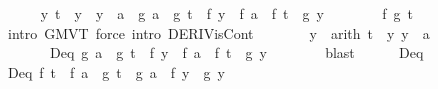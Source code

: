 \begin{isabellebody}
\isanewline
\ \ \ \ \isamarkupfalse%
\ {\isachardoublequoteopen}{\isasymexists}y{\isachardot}{\kern0pt}\ t\ {\isacharless}{\kern0pt}\ y\ {\isasymand}\ y\ {\isacharless}{\kern0pt}\ a\ {\isasymand}\ {\isacharparenleft}{\kern0pt}g\ a\ {\isacharminus}{\kern0pt}\ g\ t{\isacharparenright}{\kern0pt}\ {\isacharasterisk}{\kern0pt}\ f{\isacharprime}{\kern0pt}\ y\ {\isacharequal}{\kern0pt}\ {\isacharparenleft}{\kern0pt}f\ a\ {\isacharminus}{\kern0pt}\ f\ t{\isacharparenright}{\kern0pt}\ {\isacharasterisk}{\kern0pt}\ g{\isacharprime}{\kern0pt}\ y{\isachardoublequoteclose}\isanewline
\ \ \ \ \ \ \isamarkupfalse%
\ f{}\ g{}\ t{\isacharparenleft}{\kern0pt}{}{\isacharcomma}{\kern0pt}{}{\isacharparenright}{\kern0pt}\ \isamarkupfalse%
\ {\isacharparenleft}{\kern0pt}intro\ GMVT{\isacharprime}{\kern0pt}{\isacharparenright}{\kern0pt}\ {\isacharparenleft}{\kern0pt}force\ intro{\isacharbang}{\kern0pt}{\isacharcolon}{\kern0pt}\ DERIV{\isacharunderscore}{\kern0pt}isCont{\isacharparenright}{\kern0pt}{\isacharplus}{\kern0pt}\isanewline
\ \ \ \ \isamarkupfalse%
\ \isamarkupfalse%
\ y\ \ {\isacharbrackleft}{\kern0pt}arith{\isacharbrackright}{\kern0pt}{\isacharcolon}{\kern0pt}\ {\isachardoublequoteopen}t\ {\isacharless}{\kern0pt}\ y{\isachardoublequoteclose}\ {\isachardoublequoteopen}y\ {\isacharless}{\kern0pt}\ a{\isachardoublequoteclose}\isanewline
\ \ \ \ \ \ \ D{\isacharunderscore}{\kern0pt}eq{}{\isacharcolon}{\kern0pt}\ {\isachardoublequoteopen}{\isacharparenleft}{\kern0pt}g\ a\ {\isacharminus}{\kern0pt}\ g\ t{\isacharparenright}{\kern0pt}\ {\isacharasterisk}{\kern0pt}\ f{\isacharprime}{\kern0pt}\ y\ {\isacharequal}{\kern0pt}\ {\isacharparenleft}{\kern0pt}f\ a\ {\isacharminus}{\kern0pt}\ f\ t{\isacharparenright}{\kern0pt}\ {\isacharasterisk}{\kern0pt}\ g{\isacharprime}{\kern0pt}\ y{\isachardoublequoteclose}\isanewline
\ \ \ \ \ \ \isamarkupfalse%
\ blast\isanewline
\ \ \ \ \isamarkupfalse%
\ D{\isacharunderscore}{\kern0pt}eq{}\ \isamarkupfalse%
\ D{\isacharunderscore}{\kern0pt}eq{\isacharcolon}{\kern0pt}\ {\isachardoublequoteopen}{\isacharparenleft}{\kern0pt}f\ t\ {\isacharminus}{\kern0pt}\ f\ a{\isacharparenright}{\kern0pt}\ {\isacharslash}{\kern0pt}\ {\isacharparenleft}{\kern0pt}g\ t\ {\isacharminus}{\kern0pt}\ g\ a{\isacharparenright}{\kern0pt}\ {\isacharequal}{\kern0pt}\ f{\isacharprime}{\kern0pt}\ y\ {\isacharslash}{\kern0pt}\ g{\isacharprime}{\kern0pt}\ y{\isachardoublequoteclose}\isanewline

\end{isabellebody}
